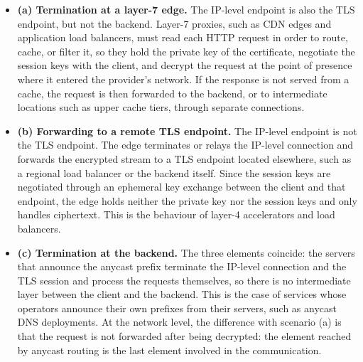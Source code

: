 \begin{itemize}
    \item \textbf{(a) Termination at a layer-7 edge.} The IP-level endpoint is also the TLS endpoint, but not the backend. Layer-7 proxies, such as CDN edges and application load balancers, must read each HTTP request in order to route, cache, or filter it, so they hold the private key of the certificate, negotiate the session keys with the client, and decrypt the request at the point of presence where it entered the provider's network. If the response is not served from a cache, the request is then forwarded to the backend, or to intermediate locations such as upper cache tiers, through separate connections.

    \item \textbf{(b) Forwarding to a remote TLS endpoint.} The IP-level endpoint is not the TLS endpoint. The edge terminates or relays the IP-level connection and forwards the encrypted stream to a TLS endpoint located elsewhere, such as a regional load balancer or the backend itself. Since the session keys are negotiated through an ephemeral key exchange between the client and that endpoint, the edge holds neither the private key nor the session keys and only handles ciphertext. This is the behaviour of layer-4 accelerators and load balancers.

    \item \textbf{(c) Termination at the backend.} The three elements coincide: the servers that announce the anycast prefix terminate the IP-level connection and the TLS session and process the requests themselves, so there is no intermediate layer between the client and the backend. This is the case of services whose operators announce their own prefixes from their servers, such as anycast DNS deployments. At the network level, the difference with scenario (a) is that the request is not forwarded after being decrypted: the element reached by anycast routing is the last element involved in the communication.
\end{itemize}

